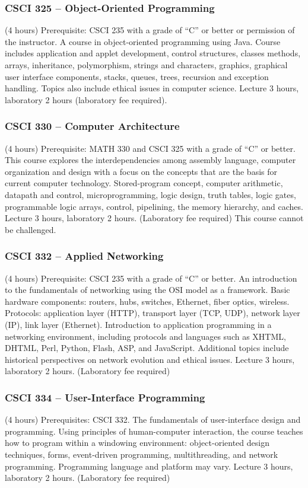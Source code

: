 \subsubsection{CSCI 325 -- Object-Oriented Programming}
(4 hours) Prerequisite: CSCI 235 with a grade of “C” or better or permission of the instructor. A course in object-oriented programming using Java. Course includes application and applet development, control structures, classes methods, arrays, inheritance, polymorphism, strings and characters, graphics, graphical user interface components, stacks, queues, trees, recursion and exception handling. Topics also include ethical issues in computer science. Lecture 3 hours, laboratory 2 hours (laboratory fee required).

\subsubsection{CSCI 330 -- Computer Architecture}
(4 hours) Prerequisite: MATH 330 and CSCI 325 with a grade of “C” or better. This course explores the interdependencies among assembly language, computer organization and design with a focus on the concepts that are the basis for current computer technology. Stored-program concept, computer arithmetic, datapath and control, microprogramming, logic design, truth tables, logic gates, programmable logic arrays, control, pipelining, the memory hierarchy, and caches. Lecture 3 hours, laboratory 2 hours. (Laboratory fee required) This course cannot be challenged.

\subsubsection{CSCI 332 -- Applied Networking}
(4 hours) Prerequisite: CSCI 235 with a grade of “C” or better. An introduction to the fundamentals of networking using the OSI model as a framework. Basic hardware components: routers, hubs, switches, Ethernet, fiber optics, wireless. Protocols: application layer (HTTP), transport layer (TCP, UDP), network layer (IP), link layer (Ethernet). Introduction to application programming in a networking environment, including protocols and languages such as XHTML, DHTML, Perl, Python, Flash, ASP, and JavaScript. Additional topics include historical perspectives on network evolution and ethical issues. Lecture 3 hours, laboratory 2 hours. (Laboratory fee required)

\subsubsection{CSCI 334 -- User-Interface Programming}
(4 hours) Prerequisites: CSCI 332. The fundamentals of user-interface design and programming. Using principles of human-computer interaction, the course teaches how to program within a windowing environment: object-oriented design techniques, forms, event-driven programming, multithreading, and network programming. Programming language and platform may vary. Lecture 3 hours, laboratory 2 hours. (Laboratory fee required)

